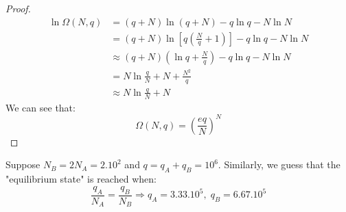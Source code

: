 \documentclass[~/PhyAI/phyai.tex]{subfiles}
\begin{document}
\begin{proof}
	\begin{equation*}
		\begin{split}
			\ln{\Omega(N,q)}&=(q+N)\ln{(q+N)}-q\ln{q}-N\ln{N}\\
			&=(q+N)\ln{\left[q \left(\frac{N}{q}+1\right)\right]}-q\ln{q}-N\ln{N}\\
			&\approx (q+N)\left(\ln{q}+\frac{N }{q}\right)-q\ln{q}-N\ln{N}\\
			&=N\ln{\frac{q }{N}}+N+\frac{N^{2}}{q}\\
			&\approx N\ln{\frac{q }{N}}+N
		\end{split}
	\end{equation*}
	We can see that:
	\begin{equation*}
		\Omega(N,q)=\left(\frac{eq }{N}\right)^{N}
	\end{equation*}
\end{proof}
Suppose $N_{B}=2N_{A}=2.10^{2}$ and $q=q_{A}+q_{B}=10^{6}$. Similarly, we guess that the "equilibrium state" is reached when:
$$ \frac{q_{A} }{N_{A}}=\frac{q_{B}}{N_{B}}\Rightarrow q_{A}=3.33.10^{5},\; q_{B}=6.67.10^{5} $$
\end{document}
